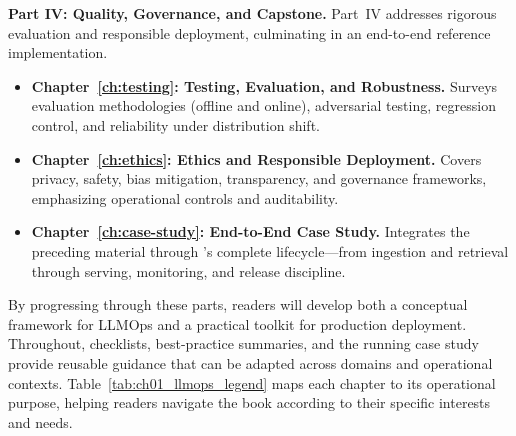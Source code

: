 \medskip
\noindent\textbf{Part IV: Quality, Governance, and Capstone.}
Part~IV addresses rigorous evaluation and responsible deployment, culminating in an end-to-end reference implementation.
\begin{itemize}
  \item \textbf{Chapter~\ref{ch:testing}: Testing, Evaluation, and Robustness.}
  Surveys evaluation methodologies (offline and online), adversarial testing, regression control, and reliability under distribution shift.
  \item \textbf{Chapter~\ref{ch:ethics}: Ethics and Responsible Deployment.}
  Covers privacy, safety, bias mitigation, transparency, and governance frameworks, emphasizing operational controls and auditability.
  \item \textbf{Chapter~\ref{ch:case-study}: End-to-End Case Study.}
  Integrates the preceding material through \ishtar{}'s complete lifecycle---from ingestion and retrieval through serving, monitoring, and release discipline.
\end{itemize}

\medskip
\noindent By progressing through these parts, readers will develop both a conceptual framework for LLMOps and a practical toolkit for production deployment. Throughout, checklists, best-practice summaries, and the running \ishtar{} case study provide reusable guidance that can be adapted across domains and operational contexts. Table~\ref{tab:ch01_llmops_legend} maps each chapter to its operational purpose, helping readers navigate the book according to their specific interests and needs.

